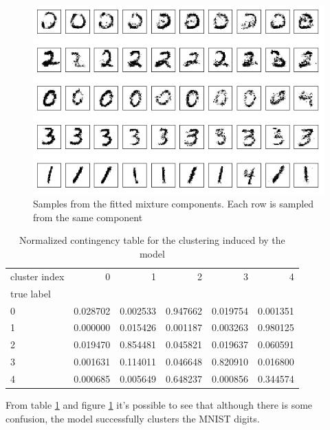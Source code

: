 \begin{figure}[!htb]
  \centering
  \includegraphics[width=0.85\linewidth]{figures/trained_mnist.png}
  \caption{Samples from the fitted mixture components. Each row is sampled
  from the same component}
  \label{fig:mnist_samples}
\end{figure}

\begin{table}[h]
\centering
\begin{tabular}{lrrrrr}
\toprule
 cluster index&         0 &         1 &         2 &         3 &         4 \\
true label &           &           &           &           &           \\
\midrule
0    &  0.028702 &  0.002533 &  0.947662 &  0.019754 &  0.001351 \\
1    &  0.000000 &  0.015426 &  0.001187 &  0.003263 &  0.980125 \\
2    &  0.019470 &  0.854481 &  0.045821 &  0.019637 &  0.060591 \\
3    &  0.001631 &  0.114011 &  0.046648 &  0.820910 &  0.016800 \\
4    &  0.000685 &  0.005649 &  0.648237 &  0.000856 &  0.344574 \\
\bottomrule
\end{tabular}
\caption{Normalized contingency table for the clustering induced by the model}
\label{table:contingency}
\end{table}

From table \ref{table:contingency} and figure \ref{fig:mnist_samples} it's possible
to see that although there is some confusion, the model successfully clusters
the MNIST digits.
